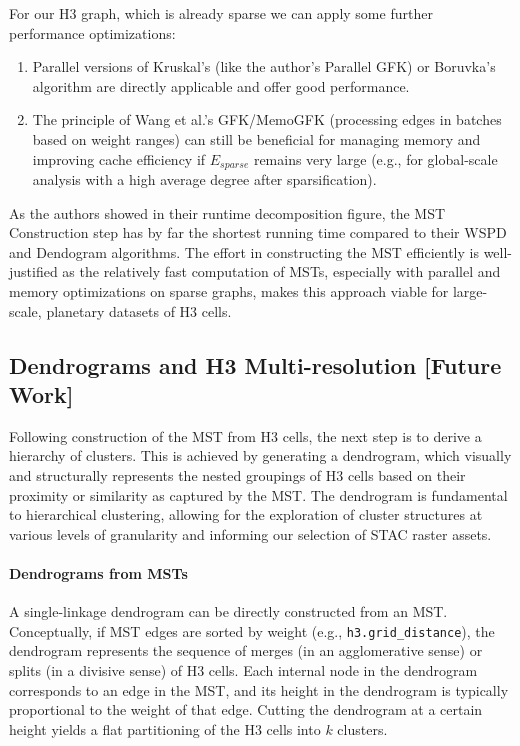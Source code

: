 For our H3 graph, which is already sparse we can apply some further performance optimizations:
\begin{enumerate}
    \item Parallel versions of Kruskal's (like the author's Parallel GFK) or Boruvka's algorithm are directly applicable and offer good performance.
    \item The principle of Wang et al.'s GFK/MemoGFK (processing edges in batches based on weight ranges) can still be beneficial for managing memory and improving cache efficiency if $E_{sparse}$ remains very large (e.g., for global-scale analysis with a high average degree after sparsification).
\end{enumerate}
As the authors showed in their runtime decomposition figure, the MST Construction step has by far the shortest running time compared to their WSPD and Dendogram algorithms.
The effort in constructing the MST efficiently is well-justified as the relatively fast computation of MSTs, especially with parallel and memory optimizations on sparse graphs, makes this approach viable for large-scale, planetary datasets of H3 cells.

\subsection{Dendrograms and H3 Multi-resolution [Future Work]}
\label{subsec:dendrogram_construction}

Following construction of the MST from H3 cells, the next step is to derive a hierarchy of clusters. 
This is achieved by generating a dendrogram, which visually and structurally represents the nested groupings of H3 cells based on their proximity or similarity as captured by the MST. 
The dendrogram is fundamental to hierarchical clustering, allowing for the exploration of cluster structures at various levels of granularity and informing our selection of STAC raster assets.

\paragraph{Dendrograms from MSTs}
A single-linkage dendrogram can be directly constructed from an MST. Conceptually, if MST edges are sorted by weight (e.g., \texttt{h3.grid\_distance}), the dendrogram represents 
the sequence of merges (in an agglomerative sense) or splits (in a divisive sense) of H3 cells. Each internal node in the dendrogram corresponds to an edge in the MST, and 
its height in the dendrogram is typically proportional to the weight of that edge. Cutting the dendrogram at a certain height yields a flat partitioning of the H3 cells into $k$ clusters.

